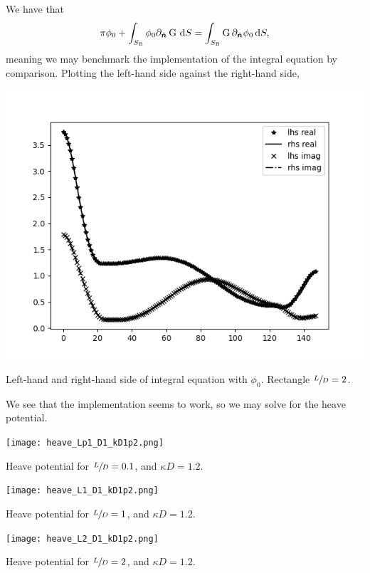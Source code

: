 We have that
\[
    \pi \phi_0 + \int_{S_{\mathrm{B}}} \phi_0 \partial_{\bm{\hat{n}}} \operatorname{G} \,\mathrm{d} S = \int_{S_{\mathrm{B}}} \operatorname{G} \partial_{\bm{\hat{n}}} \phi_0 \,\mathrm{d} S,
\]
meaning we may benchmark the implementation of the integral equation by comparison.
Plotting the left-hand side against the right-hand side,
\begin{Figure}
    \centering
    \captionsetup{type = figure}
    \includegraphics[width = \textwidth]{phi0_L2_D1_kD1point2.png}
    \caption{Left-hand and right-hand side of integral equation with $\phi_0$. Rectangle $\sfrac{L}{D} = 2$.}
\end{Figure}
\noindent We see that the implementation seems to work, so we may solve for the heave potential.
\begin{Figure}
    \centering
    \captionsetup{type = figure}
    \texttt{[image: heave\_Lp1\_D1\_kD1p2.png]}
    \caption{Heave potential for $\sfrac{L}{D} = 0.1$, and $\kappa D = 1.2$.}
\end{Figure}
\begin{Figure}
    \centering
    \captionsetup{type = figure}
    \texttt{[image: heave\_L1\_D1\_kD1p2.png]}
    \caption{Heave potential for $\sfrac{L}{D} = 1$, and $\kappa D = 1.2$.}
\end{Figure}
\begin{Figure}
    \centering
    \captionsetup{type = figure}
    \texttt{[image: heave\_L2\_D1\_kD1p2.png]}
    \caption{Heave potential for $\sfrac{L}{D} = 2$, and $\kappa D = 1.2$.}
\end{Figure}
